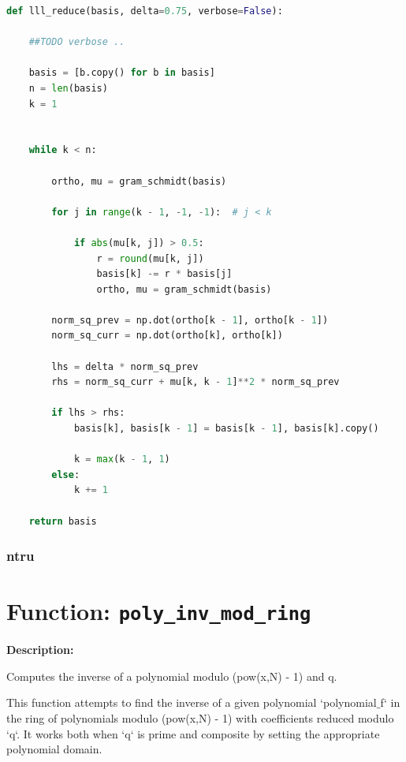 \documentclass[a4paper,12pt]{article}
\begin{document}
\begin{lstlisting}[language=Python]
def lll_reduce(basis, delta=0.75, verbose=False):

    ##TODO verbose ..

    basis = [b.copy() for b in basis]
    n = len(basis)
    k = 1


    while k < n:

        ortho, mu = gram_schmidt(basis)

        for j in range(k - 1, -1, -1):  # j < k

            if abs(mu[k, j]) > 0.5:
                r = round(mu[k, j])
                basis[k] -= r * basis[j]
                ortho, mu = gram_schmidt(basis)

        norm_sq_prev = np.dot(ortho[k - 1], ortho[k - 1])
        norm_sq_curr = np.dot(ortho[k], ortho[k])

        lhs = delta * norm_sq_prev
        rhs = norm_sq_curr + mu[k, k - 1]**2 * norm_sq_prev

        if lhs > rhs:
            basis[k], basis[k - 1] = basis[k - 1], basis[k].copy()

            k = max(k - 1, 1)
        else:
            k += 1

    return basis
\end{lstlisting}












\subsubsection{ntru}

\section*{Function: \texttt{poly\_inv\_mod\_ring}}

\textbf{Description:}

Computes the inverse of a polynomial modulo (pow(x,N) - 1) and q.

This function attempts to find the inverse of a given polynomial `polynomial$\_$f` in the ring
of polynomials modulo (pow(x,N) - 1) with coefficients reduced modulo `q`. It works both when `q`
is prime and composite by setting the appropriate polynomial domain.
\end{document}
